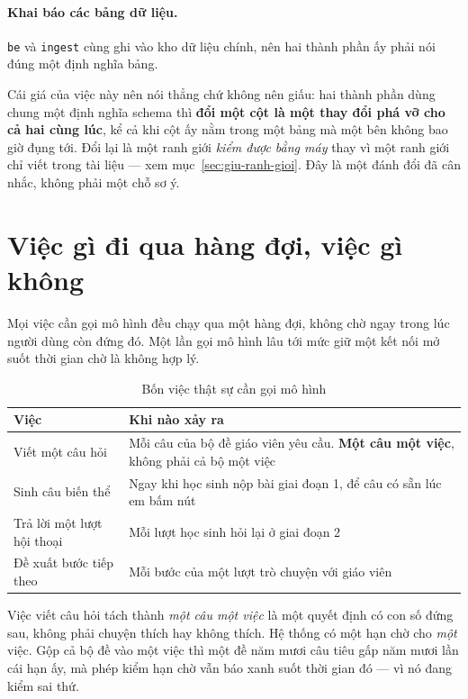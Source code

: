 \paragraph{Khai báo các bảng dữ liệu.} \texttt{be} và \texttt{ingest} cùng ghi vào kho dữ liệu
chính, nên hai thành phần ấy phải nói đúng một định nghĩa bảng.

Cái giá của việc này nên nói thẳng chứ không nên giấu: hai thành phần dùng chung một định nghĩa
schema thì \textbf{đổi một cột là một thay đổi phá vỡ cho cả hai cùng lúc}, kể cả khi cột ấy nằm
trong một bảng mà một bên không bao giờ đụng tới. Đổi lại là một ranh giới \emph{kiểm được bằng
máy} thay vì một ranh giới chỉ viết trong tài liệu --- xem mục~\ref{sec:giu-ranh-gioi}. Đây là
một đánh đổi đã cân nhắc, không phải một chỗ sơ ý.

\section{Việc gì đi qua hàng đợi, việc gì không}
\label{sec:hang-doi}

Mọi việc cần gọi mô hình đều chạy qua một hàng đợi, không chờ ngay trong lúc người dùng còn
đứng đó. Một lần gọi mô hình lâu tới mức giữ một kết nối mở suốt thời gian chờ là không hợp lý.

\begin{table}[htbp]
\centering
\caption{Bốn việc thật sự cần gọi mô hình}
\label{tab:bon-viec}
\begin{tabular}{@{}L{4.2cm}L{9.6cm}@{}}
\toprule
\textbf{Việc} & \textbf{Khi nào xảy ra} \\
\midrule
Viết một câu hỏi & Mỗi câu của bộ đề giáo viên yêu cầu. \textbf{Một câu một việc}, không phải cả bộ một việc \\
\addlinespace
Sinh câu biến thể & Ngay khi học sinh nộp bài giai đoạn 1, để câu có sẵn lúc em bấm nút \\
\addlinespace
Trả lời một lượt hội thoại & Mỗi lượt học sinh hỏi lại ở giai đoạn 2 \\
\addlinespace
Đề xuất bước tiếp theo & Mỗi bước của một lượt trò chuyện với giáo viên \\
\bottomrule
\end{tabular}
\end{table}

Việc viết câu hỏi tách thành \emph{một câu một việc} là một quyết định có con số đứng sau,
không phải chuyện thích hay không thích. Hệ thống có một hạn chờ cho \emph{một} việc. Gộp cả bộ
đề vào một việc thì một đề năm mươi câu tiêu gấp năm mươi lần cái hạn ấy, mà phép kiểm hạn chờ
vẫn báo xanh suốt thời gian đó --- vì nó đang kiểm sai thứ.

